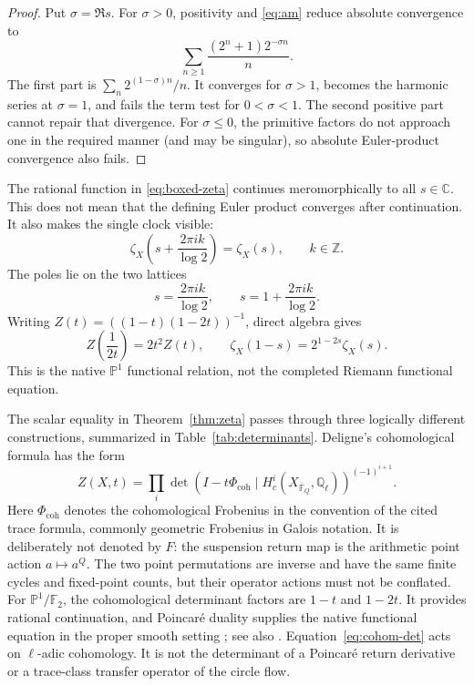 \documentclass[11pt]{article}
\theoremstyle{definition}
\theoremstyle{remark}
\newcommand{\Z}{\mathbb{Z}}
\newcommand{\F}{\mathbb{F}}
\newcommand{\C}{\mathbb{C}}
\begin{document}
\begin{proof}
Put \(\sigma=\Re s\).  For \(\sigma>0\), positivity and
\eqref{eq:am} reduce absolute convergence to
\begin{equation}
  \sum_{n\geq1}\frac{(2^n+1)2^{-\sigma n}}n.
  \label{eq:convseries}
\end{equation}
The first part is \(\sum_n2^{(1-\sigma)n}/n\).  It converges for
\(\sigma>1\), becomes the harmonic series at \(\sigma=1\), and fails the
term test for \(0<\sigma<1\).  The second positive part cannot repair that
divergence.  For \(\sigma\leq0\), the primitive factors do not approach one
in the required manner (and may be singular), so absolute Euler-product
convergence also fails.
\end{proof}

The rational function in \eqref{eq:boxed-zeta} continues meromorphically to
all \(s\in\C\).  This does not mean that the defining Euler product converges
after continuation.  It also makes the single clock visible:
\begin{equation}
  \zeta_X\!\left(s+\frac{2\pi i k}{\log2}\right)=\zeta_X(s),
  \qquad k\in\Z.
  \label{eq:imag-period}
\end{equation}
The poles lie on the two lattices
\[
  s=\frac{2\pi i k}{\log2},
  \qquad
  s=1+\frac{2\pi i k}{\log2}.
\]
Writing \(Z(t)=((1-t)(1-2t))^{-1}\), direct algebra gives
\[
  Z\!\left(\frac1{2t}\right)=2t^2Z(t),
  \qquad
  \zeta_X(1-s)=2^{1-2s}\zeta_X(s).
\]
This is the native \(\mathbb P^1\) functional relation, not the completed
Riemann functional equation.

The scalar equality in Theorem~\ref{thm:zeta} passes through three logically
different constructions, summarized in Table~\ref{tab:determinants}.
Deligne's cohomological formula has the form
\begin{equation}
  Z(X,t)=\prod_i
  \det\!\left(I-t\Phi_{\mathrm{coh}}\mid
  H_c^i(X_{\overline{\F}_Q},\mathbb Q_\ell)\right)^{(-1)^{i+1}}.
  \label{eq:cohom-det}
\end{equation}
Here \(\Phi_{\mathrm{coh}}\) denotes the cohomological Frobenius in the
convention of the cited trace formula, commonly geometric Frobenius in Galois
notation.  It is deliberately not denoted by \(F\): the suspension return map
is the arithmetic point action \(a\mapsto a^Q\).  The two point permutations
are inverse and have the same finite cycles and fixed-point counts, but their
operator actions must not be conflated.  For \(\mathbb P^1/\F_2\), the
cohomological determinant factors are \(1-t\) and \(1-2t\).
It provides rational continuation, and Poincar\'e duality supplies the native
functional equation in the proper smooth setting
\citep[Secs.~1.5 and 2.6]{Deligne1974}; see also
\citep[Secs.~26--29]{Milne2013}.  Equation~\eqref{eq:cohom-det} acts on
\(\ell\)-adic cohomology.  It is not the determinant of a Poincar\'e return
derivative or a trace-class transfer operator of the circle flow.
\end{document}

